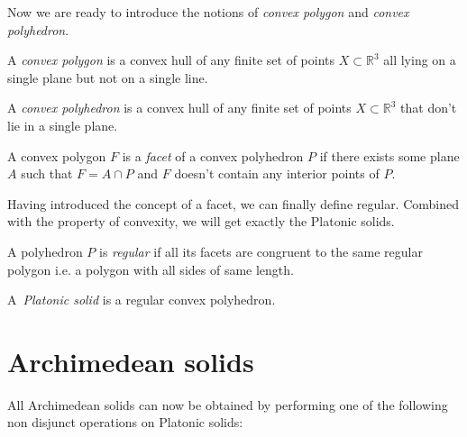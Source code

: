 Now we are ready to introduce the notions of \emph{convex polygon} and \emph{convex polyhedron}.

\begin{define}
A {\sl convex polygon} is a convex hull of any finite set of points $X \subset \mathbb{R}^3$ all lying on a single plane but not on a single line.
\end{define}

\begin{define}
A {\sl convex polyhedron} is a convex hull of any finite set of points $X \subset \mathbb{R}^3$ that don't lie in a single plane.
\end{define}

\begin{define}
A convex polygon $F$ is a {\sl facet} of a convex polyhedron $P$ if there exists some plane $A$ such that $F=A\cap P$ and $F$ doesn't contain any interior points of $P$.
\end{define}

Having introduced the concept of a facet, we can finally define regular. Combined with the property of convexity, we will get exactly the Platonic solids.

\begin{define}
A polyhedron $P$ is {\sl regular} if all its facets are congruent to the same regular polygon i.e. a polygon with all sides of same length.
\end{define}

\begin{define}
A~{\sl Platonic solid} is a regular convex polyhedron.
\end{define}

\section{Archimedean solids}

All Archimedean solids can now be obtained by performing one of the following non disjunct operations on Platonic solids:

